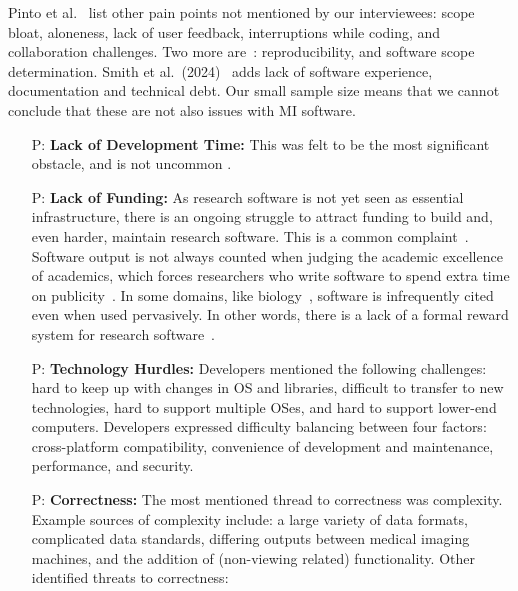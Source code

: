 \documentclass[draft, 12pt, 3p, times]{elsarticle} %
\newcounter{pnum} %
\begin{document}
Pinto et al.~\cite{PintoEtAl2018} list other pain points not mentioned by our
interviewees: scope bloat, aloneness, lack of user feedback, interruptions while
coding, and collaboration challenges. Two more are~\cite{WieseEtAl2019}:
reproducibility, and software scope determination.  Smith et al.\
(2024)~\cite{SmithEtAl2024} adds lack of software experience, documentation and
technical debt.  Our small sample size means that we cannot conclude that these
are not also issues with MI software.

\begin{enumerate}

\item[P\refstepcounter{pnum}\thepnum \label{P_LackDevTime}:] \textbf{Lack of
Development Time:} This was felt to be the most significant obstacle, and is not
uncommon \cite{SmithEtAl2024, WieseEtAl2019, PintoEtAl2018, PintoEtAl2016}.

\item[P\refstepcounter{pnum}\thepnum \label{P_LackFunding}:] \textbf{Lack of
Funding:} As research software is not yet seen as essential infrastructure,
there is an ongoing struggle to attract funding to build and, even harder,
maintain research software. This is a common complaint~\cite{SmithEtAl2024,
GewaltigAndCannon2012, Goble2014, KaterbowAndFeulner2018}.  Software output is
not always counted when judging the academic excellence of academics, which
forces researchers who write software to spend extra time on
publicity~\cite{WieseEtAl2019}. In some domains, like
biology~\cite{HowisonAndBullard2016}, software is infrequently cited even when
used pervasively. In other words, there is a lack of a formal reward system for
research software~\cite{PintoEtAl2018}.

\item[P\refstepcounter{pnum}\thepnum \label{P_TechnologyHurdles}:]
\textbf{Technology Hurdles:} Developers mentioned the following challenges: hard
to keep up with changes in OS and libraries, difficult to transfer to new
technologies, hard to support multiple OSes, and hard to support lower-end
computers. Developers expressed difficulty balancing between four factors:
cross-platform compatibility, convenience of development and maintenance,
performance, and security.

\item[P\refstepcounter{pnum}\thepnum \label{P_Correctness}:]
\textbf{Correctness:} The most mentioned thread to correctness was complexity.
Example sources of complexity include: a large variety of data formats,
complicated data standards, differing outputs between medical imaging machines,
and the addition of (non-viewing related) functionality.  Other identified
threats to correctness:


\end{enumerate}
\end{document}
